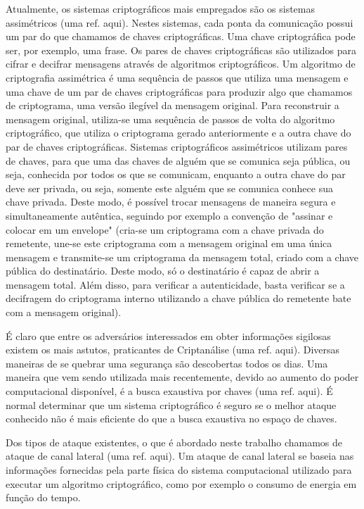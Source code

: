 Atualmente, os sistemas criptográficos mais empregados são os sistemas assimétricos (uma ref. aqui). Nestes sistemas, cada ponta da comunicação possui um par do que chamamos de chaves criptográficas. Uma chave criptográfica pode ser, por exemplo, uma frase. Os pares de chaves criptográficas são utilizados para cifrar e decifrar mensagens através de algoritmos criptográficos. Um algoritmo de criptografia assimétrica é uma sequência de passos que utiliza uma mensagem e uma chave de um par de chaves criptográficas para produzir algo que chamamos de criptograma, uma versão ilegível da mensagem original. Para reconstruir a mensagem original, utiliza-se uma sequência de passos de volta do algoritmo criptográfico, que utiliza o criptograma gerado anteriormente e a outra chave do par de chaves criptográficas. Sistemas criptográficos assimétricos utilizam pares de chaves, para que uma das chaves de alguém que se comunica seja pública, ou seja, conhecida por todos os que se comunicam, enquanto a outra chave do par deve ser privada, ou seja, somente este alguém que se comunica conhece sua chave privada. Deste modo, é possível trocar mensagens de maneira segura e simultaneamente autêntica, seguindo por exemplo a convenção de "assinar e colocar em um envelope" (cria-se um criptograma com a chave privada do remetente, une-se este criptograma com a mensagem original em uma única mensagem e transmite-se um criptograma da mensagem total, criado com a chave pública do destinatário. Deste modo, só o destinatário é capaz de abrir a mensagem total. Além disso, para verificar a autenticidade, basta verificar se a decifragem do criptograma interno utilizando a chave pública do remetente bate com a mensagem original).

É claro que entre os adversários interessados em obter informações sigilosas existem os mais astutos, praticantes de Criptanálise (uma ref. aqui). Diversas maneiras de se quebrar uma segurança são descobertas todos os dias. Uma maneira que vem sendo utilizada mais recentemente, devido ao aumento do poder computacional disponível, é a busca exaustiva por chaves (uma ref. aqui). É normal determinar que um sistema criptográfico é seguro se o melhor ataque conhecido não é mais eficiente do que a busca exaustiva no espaço de chaves.

Dos tipos de ataque existentes, o que é abordado neste trabalho chamamos de ataque de canal lateral (uma ref. aqui). Um ataque de canal lateral se baseia nas informações fornecidas pela parte física do sistema computacional utilizado para executar um algoritmo criptográfico, como por exemplo o consumo de energia em função do tempo.


